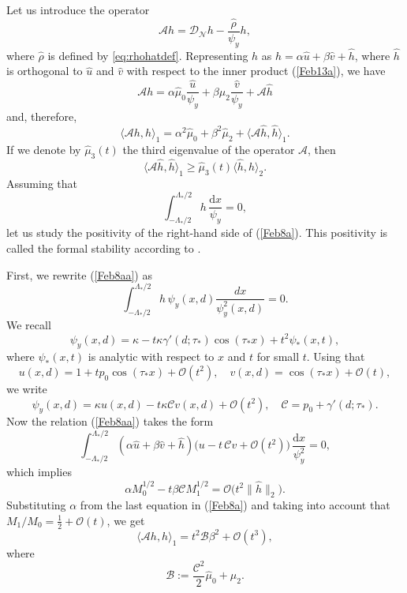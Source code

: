 \documentclass[oneside,a4paper,11pt]{article}
\theoremstyle{thmstyletwo}%
\theoremstyle{thmstylethree}%
\numberwithin{equation}{section}
\def\D{\mathrm{d}}
\def\gamm{\gamma}
\def\taust{\tau_{*}}
\def\DN{\mathcal{D}_{\mathcal{N}}}
\def\Obig{\mathcal{O}}
\begin{document}
Let us introduce the operator
$$
{\mathcal A}h=\DN h-\frac{\widehat{\rho}}{\psi_y} h,
$$
where $\widehat{\rho}$ is defined by \eqref{eq:rhohatdef}.
Representing $h$ as $h=\alpha \widehat{u}+\beta\widehat{v}+\widehat{h}$, where $\widehat{h}$ is orthogonal to $\widehat{u}$ and $\widehat{v}$ with respect to the inner product (\ref{Feb13a}), we have
\begin{equation*}%
{\mathcal A}h=\alpha\widehat{\mu}_0\frac{\widehat{u}}{\psi_y}+\beta\widehat{\mu}_2\frac{\widehat{v}}{\psi_y}+{\mathcal A}\widehat{h}
\end{equation*}
and, therefore,
\begin{equation}\label{Feb8a}
\langle {\mathcal A}h,h\rangle_1=
\alpha^2\widehat{\mu}_0+\beta^2\widehat{\mu}_2+\langle {\mathcal A}\widehat{h},\widehat{h}\rangle_1.
\end{equation}
If we denote by $\widehat{\mu}_3(t)$ the third eigenvalue of the operator ${\mathcal A}$, then
\begin{equation*}%
\langle {\mathcal A}\widehat{h},\widehat{h}\rangle_1\geq \widehat{\mu}_3(t)\langle\widehat{h},\widehat{h}\rangle_2.
\end{equation*}
Assuming that
\begin{equation}\label{Feb8aa}
\int_{-\Lambda_*/2}^{\Lambda_*/2}h\,\frac{\D x}{\psi_y}= 0,
\end{equation}
let us study the positivity of the right-hand side of (\ref{Feb8a}). This positivity is called the formal stability according to \cite{CSst2}. 

First, we rewrite (\ref{Feb8aa}) as
\begin{equation*}%
\int_{-\Lambda_*/2}^{\Lambda_*/2}h\,\psi_y(x,d)\frac{dx}{\psi^2_y(x,d)}=0.
\end{equation*}
We recall
$$
\psi_y(x,d)=\kappa-t\kappa\gamm'(d;\taust)\cos(\tau_*x)+t^2\psi_*(x,t),
$$
where $\psi_*(x,t)$ is analytic with respect to  $x$ and $t$ for small $t$. Using that
\begin{equation*}%
u(x,d)=1+tp_0\cos(\taust x)+\Obig(t^2),\quad v(x,d)=\cos(\taust x)+\Obig(t),
\end{equation*}
we write
$$
\psi_y(x,d)=\kappa u(x,d)-t\kappa\mathcal{C} v(x,d)+\Obig(t^2),\quad
\mathcal{C}=p_0+\gamm'(d;\taust).
$$
Now the relation (\ref{Feb8aa}) takes the form
\begin{equation*}
\int_{-\Lambda_*/2}^{\Lambda_*/2}(\alpha \widehat{u}+\beta \widehat{v}+\widehat{h})\bigl(u-t\,\mathcal{C}v+\Obig(t^2)\bigr)\,\frac{\D x}{\psi^2_y}=0,
\end{equation*}
which implies
\begin{equation*}
\alpha M_0^{1/2} - t \beta \mathcal{C} M_1^{1/2}=\Obig\bigl(t^2\|\widehat{h}\|_2\bigr).
\end{equation*}
Substituting $\alpha$ from the last equation in (\ref{Feb8a}) and taking into account that $M_1/M_0=\tfrac12+\Obig(t)$, we get
\begin{equation*}
\langle {\mathcal A}h,h\rangle_1=t^2\mathcal{B}\beta^2+\Obig(t^3),
\end{equation*}
where
\[
\mathcal{B}:=\frac{\mathcal{C}^2}{2}\widehat{\mu}_0+\mu_2.
\]
\end{document}
